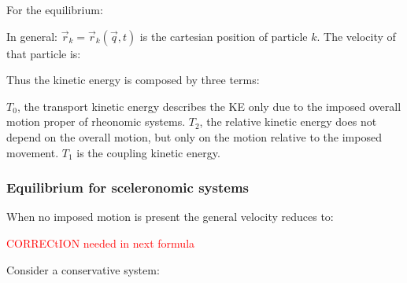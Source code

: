 \documentclass[10pt,a4paper]{scrartcl}
\begin{document}
\begin{multicols*}{2}

For the equilibrium:


In general: $\vec{r}_k=\vec{r}_k(\vec{q},t)$ is the cartesian position of particle $k$. The velocity of that particle is:


Thus the kinetic energy is composed by three terms:


$T_0$, the transport kinetic energy describes the KE only due to the imposed overall motion proper of rheonomic systems. $T_2$, the relative kinetic energy does not depend on the overall motion, but only on the motion relative to the imposed movement. $T_1$ is the coupling kinetic energy.

\subsubsection{Equilibrium for sceleronomic systems}

When no imposed motion is present the general velocity reduces to:

\textcolor{red}{CORRECtION needed in next formula}

Consider a conservative system:



\end{multicols*}
\end{document}
